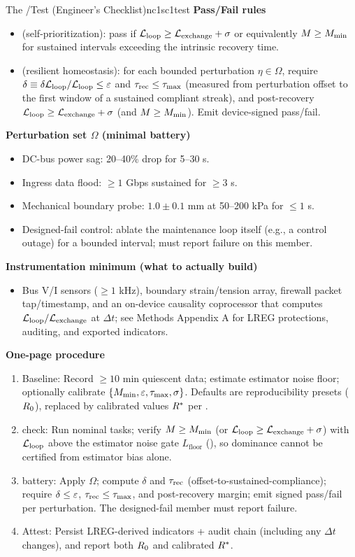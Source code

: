 \documentclass[11pt]{article}
\begin{document}
\begin{docbox}{The \NC/\SC Test (Engineer's Checklist)}{nc1sc1test}
\textbf{Pass/Fail rules}
\begin{itemize}
\item \NC (self-prioritization): pass if $\mathcal{L}_{\text{loop}} \geq \mathcal{L}_{\text{exchange}} + \sigma$ or equivalently $M \geq M_{\min}$ for sustained intervals exceeding the intrinsic recovery time.
\item \SC (resilient homeostasis): for each bounded perturbation $\eta \in \Omega$, require $\delta \equiv \delta\mathcal{L}_{\text{loop}}/\mathcal{L}_{\text{loop}} \leq \varepsilon$ and $\tau_{\text{rec}} \leq \tau_{\max}$ (measured from perturbation offset to the first window of a sustained compliant streak), and post-recovery $\mathcal{L}_{\text{loop}} \geq \mathcal{L}_{\text{exchange}} + \sigma$ (and $M \geq M_{\min}$). Emit device-signed pass/fail.
\end{itemize}

\textbf{Perturbation set $\Omega$ (minimal battery)}
\begin{itemize}
\item DC-bus power sag: 20--40\% drop for 5--30 s.
\item Ingress data flood: $\geq 1$ Gbps sustained for $\geq 3$ s.
\item Mechanical boundary probe: $1.0 \pm 0.1$ mm at 50--200 kPa for $\leq 1$ s.
\item Designed-fail control: ablate the maintenance loop itself (e.g., a control outage) for a bounded interval; \SC must report failure on this member.
\end{itemize}

\textbf{Instrumentation minimum (what to actually build)}
\begin{itemize}
\item Bus V/I sensors ($\geq 1$ kHz), boundary strain/tension array, firewall packet tap/timestamp, and an on-device causality coprocessor that computes $\mathcal{L}_{\text{loop}}/\mathcal{L}_{\text{exchange}}$ at $\Delta t$; see Methods Appendix A for LREG protections, auditing, and exported indicators.
\end{itemize}

\textbf{One-page procedure}
\begin{enumerate}
\item Baseline: Record $\geq 10$ min quiescent data; estimate estimator noise floor; optionally calibrate $\{M_{\min}, \varepsilon, \tau_{\max}, \sigma\}$. Defaults are reproducibility presets ($R_0$), replaced by calibrated values $R^*$ per .
\item \NC check: Run nominal tasks; verify $M \geq M_{\min}$ (or $\mathcal{L}_{\text{loop}} \geq \mathcal{L}_{\text{exchange}} + \sigma$) with $\mathcal{L}_{\text{loop}}$ above the estimator noise gate $L_{\text{floor}}$ (), so dominance cannot be certified from estimator bias alone.
\item \SC battery: Apply $\Omega$; compute $\delta$ and $\tau_{\text{rec}}$ (offset-to-sustained-compliance); require $\delta \leq \varepsilon$, $\tau_{\text{rec}} \leq \tau_{\max}$, and post-recovery margin; emit signed pass/fail per perturbation. The designed-fail member must report failure.
\item Attest: Persist LREG-derived indicators + audit chain (including any $\Delta t$ changes), and report both $R_0$ and calibrated $R^*$.
\end{enumerate}


\end{docbox}
\end{document}
